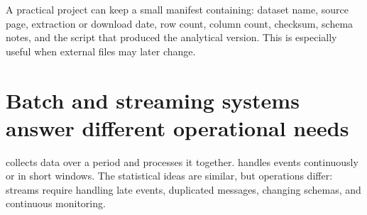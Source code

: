 \begin{referencebox}
A practical project can keep a small manifest containing: dataset name, source page, extraction or download date, row count, column count, checksum, schema notes, and the script that produced the analytical version. This is especially useful when external files may later change.
\end{referencebox}

\section{Batch and streaming systems answer different operational needs}
 collects data over a period and processes it together.  handles events continuously or in short windows. The statistical ideas are similar, but operations differ: streams require handling late events, duplicated messages, changing schemas, and continuous monitoring.

